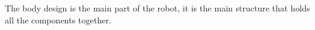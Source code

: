 The body design is the main part of the robot, it is the main structure that holds all the components together.



%
%
